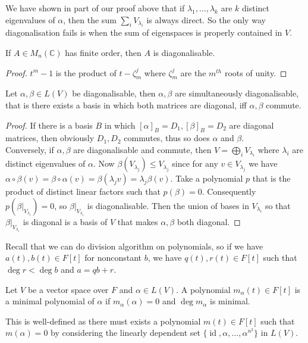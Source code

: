 \begin{remark}
    We have shown in part of our proof above that if $\lambda_1,\ldots,\lambda_k$ are $k$ distinct eigenvalues of $\alpha$, then the sum $\sum_iV_{\lambda_i}$ is always direct.
    So the only way diagonalisation fails is when the sum of eigenspaces is properly contained in $V$.
\end{remark}
\begin{corollary}
    If $A\in M_n(\mathbb C)$ has finite order, then $A$ is diagonalisable.
\end{corollary}
\begin{proof}
    $t^m-1$ is the product of $t-\zeta_m^j$ where $\zeta_m^j$ are the $m^{th}$ roots of unity.
\end{proof}
\begin{theorem}
    Let $\alpha,\beta\in L(V)$ be diagonalisable, then $\alpha,\beta$ are simultaneously diagonalisable, that is there exists a basis in which both matrices are diagonal, iff $\alpha,\beta$ commute.
\end{theorem}
\begin{proof}
    If there is a basis $B$ in which $[\alpha]_B=D_1,[\beta]_B=D_2$ are diagonal matrices, then obviously $D_1,D_2$ commutes, thus so does $\alpha$ and $\beta$.\\
    Conversely, if $\alpha,\beta$ are diagonalisable and commute, then $V=\bigoplus_iV_{\lambda_i}$ where $\lambda_i$ are distinct eigenvalues of $\alpha$.
    Now $\beta(V_{\lambda_j})\le V_{\lambda_j}$ since for any $v\in V_{\lambda_j}$ we have $\alpha\circ\beta(v)=\beta\circ\alpha(v)=\beta(\lambda_j v)=\lambda_j\beta(v)$.
    Take a polynomial $p$ that is the product of distinct linear factors such that $p(\beta)=0$.
    Consequently $p(\beta|_{V_{\lambda_i}})=0$, so $\beta|_{V_{\lambda_i}}$ is diagonalisable.
    Then the union of bases in $V_{\lambda_i}$ so that $\beta|_{V_{\lambda_i}}$ is diagonal is a basis of $V$ that makes $\alpha,\beta$ both diagonal.
\end{proof}
Recall that we can do division algorithm on polynomials, so if we have $a(t),b(t)\in F[t]$ for nonconstant $b$, we have $q(t),r(t)\in F[t]$ such that $\deg r<\deg b$ and $a=qb+r$.
\begin{definition}
    Let $V$ be a vector space over $F$ and $\alpha\in L(V)$.
    A polynomial $m_\alpha(t)\in F[t]$ is a minimal polynomial of $\alpha$ if $m_\alpha(\alpha)=0$ and $\deg m_\alpha$ is minimal.
\end{definition}
\begin{remark}
    This is well-defined as there must exists a polynomial $m(t)\in F[t]$ such that $m(\alpha)=0$ by considering the linearly dependent set $\{\operatorname{id},\alpha,\ldots,\alpha^{n^2}\}$ in $L(V)$.
\end{remark}
